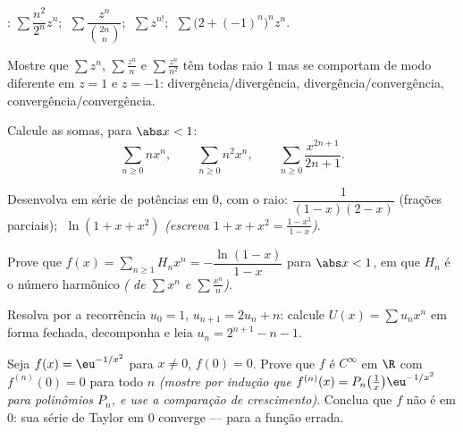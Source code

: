 \begin{exercise}[$\star$]\label{exo:b2:powerseries:1}
:
$\sum \dfrac{n^2}{2^n}z^n$; $\;\sum \dfrac{z^n}{\binom{2n}{n}}$;
$\;\sum z^{n!}$; $\;\sum \bigl(2 + (-1)^n\bigr)^n z^n$.
\end{exercise}

\begin{exercise}[$\star$]\label{exo:b2:powerseries:2}
Mostre que $\sum z^n$, $\sum \frac{z^n}{n}$ e $\sum \frac{z^n}{n^2}$
têm todas raio $1$ mas se comportam de modo diferente em $z = 1$ e $z = -1$:
divergência/divergência, divergência/convergência,
convergência/convergência.
\end{exercise}

\begin{exercise}[$\star$]\label{exo:b2:powerseries:3}
Calcule as somas, para $\abs x < 1$:
\[
\sum_{n\geq0} n x^n,
\qquad
\sum_{n\geq0} n^2 x^n,
\qquad
\sum_{n\geq0} \frac{x^{2n+1}}{2n+1} .
\]
\end{exercise}

\begin{exercise}[$\star\star$]\label{exo:b2:powerseries:4}
Desenvolva em série de potências em $0$, com o raio: $\dfrac{1}{(1-x)(2-x)}$
(frações parciais); $\;\ln(1 + x + x^2)$ \emph{(escreva $1 + x + x^2
= \frac{1 - x^3}{1 - x}$)}.
\end{exercise}

\begin{exercise}[$\star\star$]\label{exo:b2:powerseries:5}
Prove que $f(x) = \sum_{n\geq1} H_n x^n = -\dfrac{\ln(1 -
x)}{1 - x}$ para $\abs x < 1$, em que $H_n$ é o número harmônico
\emph{( de $\sum x^n$ e $\sum \frac{x^n}{n}$)}.
\end{exercise}

\begin{exercise}[$\star\star$]\label{exo:b2:powerseries:6}
Resolva por  a recorrência $u_0 = 1$, $u_{n+1} =
2u_n + n$: calcule $U(x) = \sum u_nx^n$ em forma fechada, decomponha
e leia $u_n = 2^{n+1} - n - 1$.
\end{exercise}

\begin{exercise}[$\star\star$]\label{exo:b2:powerseries:7}
Seja $f(x) = \eu^{-1/x^2}$ para $x \neq 0$, $f(0) = 0$. Prove que
$f$ é $C^\infty$ em $\R$ com $f^{(n)}(0) = 0$ para todo $n$
\emph{(mostre por indução que $f^{(n)}(x) = P_n\bigl(\frac1x\bigr)
\eu^{-1/x^2}$ para polinômios $P_n$, e use a comparação
de crescimento)}. Conclua que $f$ não é  em $0$: sua série
de Taylor em $0$ converge --- para a função errada.
\end{exercise}

